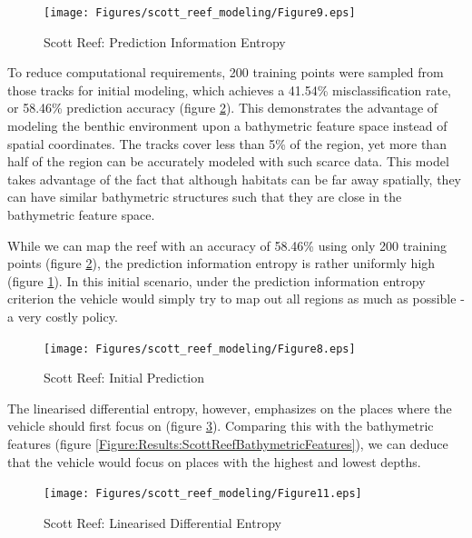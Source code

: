 \documentclass{article}
\begin{document}
		\begin{figure}[bp]
		\centering
			\texttt{[image: Figures/scott\_reef\_modeling/Figure9.eps]}
		\caption{Scott Reef: Prediction Information Entropy}
		\label{Figure:Results:ScottReefPredictionInformationEntropy}
		\end{figure}
				
		To reduce computational requirements, 200 training points were sampled from those tracks for initial modeling, which achieves a 41.54\% misclassification rate, or 58.46\% prediction accuracy (figure \ref{Figure:Results:ScottReefInitialPredictions}). This demonstrates the advantage of modeling the benthic environment upon a bathymetric feature space instead of spatial coordinates. The tracks cover less than 5\% of the region, yet more than half of the region can be accurately modeled with such scarce data. This model takes advantage of the fact that although habitats can be far away spatially, they can have similar bathymetric structures such that they are close in the bathymetric feature space.

		While we can map the reef with an accuracy of 58.46\% using only 200 training points (figure \ref{Figure:Results:ScottReefInitialPredictions}), the prediction information entropy is rather uniformly high (figure \ref{Figure:Results:ScottReefPredictionInformationEntropy}). In this initial scenario, under the prediction information entropy criterion the vehicle would simply try to map out all regions as much as possible - a very costly policy.
		
		\begin{figure}[t]
		\centering
			\texttt{[image: Figures/scott\_reef\_modeling/Figure8.eps]}
		\caption{Scott Reef: Initial Prediction}
		\label{Figure:Results:ScottReefInitialPredictions}
		\end{figure}
					
		The linearised differential entropy, however, emphasizes on the places where the vehicle should first focus on (figure \ref{Figure:Results:ScottReefLinearisedDifferentialEntropy}). Comparing this with the bathymetric features (figure \ref{Figure:Results:ScottReefBathymetricFeatures}), we can deduce that the vehicle would focus on places with the highest and lowest depths.
		
		\begin{figure}[bp]
		\centering
			\texttt{[image: Figures/scott\_reef\_modeling/Figure11.eps]}
		\caption{Scott Reef: Linearised Differential Entropy}
		\label{Figure:Results:ScottReefLinearisedDifferentialEntropy}
		\end{figure}
	
\end{document}
